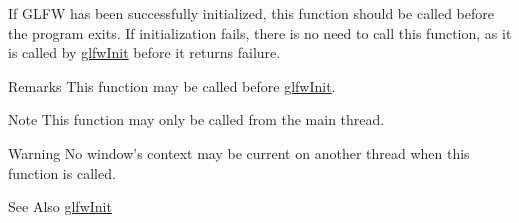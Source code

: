 If G\-L\-F\-W has been successfully initialized, this function should be called before the program exits. If initialization fails, there is no need to call this function, as it is called by \hyperlink{group__init_gab41771f0215a2e0afb4cf1cf98082d40}{glfw\-Init} before it returns failure.

\begin{DoxyRemark}{Remarks}
This function may be called before \hyperlink{group__init_gab41771f0215a2e0afb4cf1cf98082d40}{glfw\-Init}.
\end{DoxyRemark}
\begin{DoxyNote}{Note}
This function may only be called from the main thread.
\end{DoxyNote}
\begin{DoxyWarning}{Warning}
No window's context may be current on another thread when this function is called.
\end{DoxyWarning}
\begin{DoxySeeAlso}{See Also}
\hyperlink{group__init_gab41771f0215a2e0afb4cf1cf98082d40}{glfw\-Init} 
\end{DoxySeeAlso}
